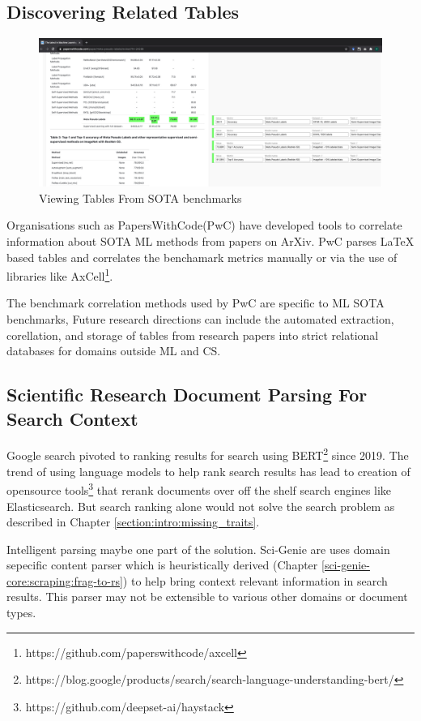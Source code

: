 \subsection{Discovering Related Tables}
\begin{figure}[h]
    \centering
    \includegraphics[width=\maxwidth{\textwidth}]{src/images/pwc-table-exp.pdf}
    \caption{ Viewing Tables From SOTA benchmarks }
    \label{figure\arabic{figurecounter}}
\end{figure}
Organisations such as PapersWithCode(PwC) have developed tools to correlate information about SOTA ML methods from papers on ArXiv. PwC parses LaTeX based tables and correlates the benchamark metrics manually or via the use of libraries like AxCell\footnote{https://github.com/paperswithcode/axcell}. 

The benchmark correlation methods used by PwC are specific to ML SOTA benchmarks, Future research directions can include the automated extraction, corellation, and storage of tables from research papers into strict relational databases for domains outside ML and CS. 

\subsection{Scientific Research Document Parsing For Search Context}
Google search pivoted to ranking results for search using BERT\footnote{https://blog.google/products/search/search-language-understanding-bert/} since 2019. The trend of using language models to help rank search results has lead to creation of opensource tools\footnote{https://github.com/deepset-ai/haystack} that rerank documents over off the shelf search engines like Elasticsearch. But search ranking alone would not solve the search problem as described in Chapter \ref{section:intro:missing_traits}.

Intelligent parsing maybe one part of the solution. Sci-Genie are uses domain sepecific content parser which is heuristically derived (Chapter \ref{sci-genie-core:scraping:frag-to-rs}) to help bring context relevant information in search results. This parser may not be extensible to various other domains or document types.

